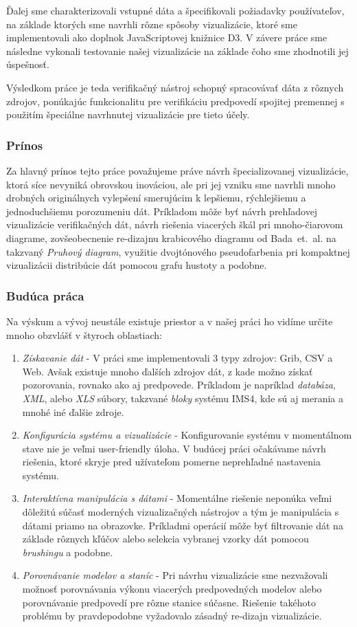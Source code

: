 Ďalej sme charakterizovali vstupné dáta a špecifikovali požiadavky používateľov, na základe ktorých sme navrhli rôzne spôsoby vizualizácie, ktoré sme implementovali ako doplnok JavaScriptovej knižnice D3. V závere práce sme následne vykonali testovanie našej vizualizácie na základe čoho sme zhodnotili jej úspešnosť.

Výsledkom práce je teda verifikačný nástroj schopný spracovávať dáta z rôznych zdrojov, ponúkajúc funkcionalitu pre verifikáciu predpovedí spojitej premennej s použitím špeciálne navrhnutej vizualizácie pre tieto účely. 

\subsubsection{Prínos}

Za hlavný prínos tejto práce považujeme práve návrh špecializovanej vizualizácie, ktorá síce nevyniká obrovskou inováciou, ale pri jej vzniku sme navrhli mnoho drobných originálnych vylepšení smerujúcim k lepšiemu, rýchlejšiemu a jednoduchšiemu porozumeniu dát. Príkladom môže byť návrh prehľadovej vizualizácie verifikačných dát, návrh riešenia viacerých škál pri \mbox{mnoho-čiarovom} diagrame, zovšeobecnenie re-dizajnu krabicového diagramu od \mbox{Bada et. al.} \cite{Bade} na takzvaný \textit{Pruhový diagram}, využitie dvojtónového pseudofarbenia pri kompaktnej vizualizácii distribúcie dát pomocou grafu hustoty a podobne.

\subsubsection{Budúca práca}

Na výskum a vývoj neustále existuje priestor a v našej práci ho vidíme určite mnoho obzvlášť v štyroch oblastiach:
\begin{enumerate}
	\item \textit{Získavanie dát} - V práci sme implementovali 3 typy zdrojov: Grib, CSV a Web. Avšak existuje mnoho ďalších zdrojov dát, z kade možno získať pozorovania, rovnako ako aj predpovede. Príkladom je napríklad \textit{databáza}, \textit{XML}, alebo \textit{XLS} súbory, takzvané \textit{bloky} systému IMS4, kde sú aj merania a mnohé iné ďalšie zdroje. 
	\item \textit{Konfigurácia systému a vizualizácie} - Konfigurovanie systému v momentálnom stave nie je veľmi user-friendly úloha. V budúcej práci očakávame návrh riešenia, ktoré skryje pred užívateľom pomerne neprehľadné nastavenia systému.
	\item \textit{Interaktívna manipulácia s dátami} - Momentálne riešenie neponúka veľmi dôležitú súčasť moderných vizualizačných nástrojov a tým je manipulácia s dátami priamo na obrazovke. Príkladmi operácií môže byť filtrovanie dát na základe rôznych kľúčov alebo selekcia vybranej vzorky dát pomocou \textit{brushingu} a podobne.
	\item \textit{Porovnávanie modelov a staníc} - Pri návrhu vizualizácie sme nezvažovali možnosť porovnávania výkonu viacerých predpovedných modelov alebo porovnávanie predpovedí pre rôzne stanice súčasne. Riešenie takéhoto problému by pravdepodobne vyžadovalo zásadný re-dizajn vizualizácie.
\end{enumerate}